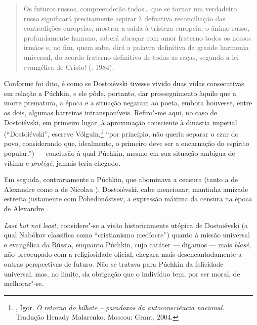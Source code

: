 \begin{quotation}
Os futuros russos, compreenderão todos\ldots{} que se tornar um verdadeiro russo significará precisamente aspirar à definitiva reconciliação das contradições europeias, mostrar a saída à tristeza europeia: o ânimo russo, profundamente humano, saberá abraçar com amor fraterno todos os nossos irmãos e, no fim, quem sabe, dirá a palavra definitiva da grande harmonia universal, do acordo fraterno definitivo de todas as raças, segundo a lei evangélica de Cristo! (, 1984).
\end{quotation}

Conforme foi dito, é como se Dostoiévski tivesse vivido duas vidas
consecutivas em relação a Púchkin, e ele pôde, portanto, dar
prosseguimento àquilo que a morte prematura, a época e a situação
negaram ao poeta, embora houvesse, entre os dois, algumas
barreiras intransponíveis. Refiro"-me aqui, no caso de
Dostoiévski, em primeiro lugar, à aproximação consciente
à dinastia imperial (``Dostoiévski'', escreve
Vólguin,\footnote{, Ígor. \emph{O
retorno do bilhete -- paradoxos da autoconsciência
nacional.} Tradução Henady Malarenko. Moscou: Grant, 2004.} ``por
princípio, não queria separar o czar do povo, considerando que,
idealmente, o primeiro deve ser a encarnação do espírito popular.'') --- conclusão à qual Púchkin, mesmo em sua situação ambígua de vítima e \emph{protégé}, jamais teria chegado.

Em seguida, contrariamente a Púchkin, que abominava a censura
(tanto a de Alexandre  como a de Nicolau ),
Dostoiévski, cabe mencionar, mantinha amizade estreita justamente com Pobedonóstsev, a expressão máxima da censura na época de Alexandre .

\emph{Last but not least}, considere"-se a visão historicamente utópica de Dostoiévski (a qual
Nabókov classifica como ``cristianismo medíocre'') quanto à
missão universal e evangélica da Rússia, enquanto Púchkin, cujo
caráter --- digamos --- mais \emph{blasé}, não preocupado com a
religiosidade oficial, chegara mais desencantadamente a outras
perspectivas de futuro. Não se tratava para Púchkin da felicidade
universal, mas, no limite, da obrigação que o indivíduo tem, por
ser moral, de melhorar"-se.

